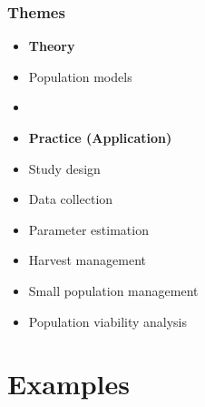 \documentclass[color=usenames,dvipsnames]{beamer}
\begin{document}
\begin{frame}
  \frametitle{Themes}
  \large
  \begin{itemize}
    \item[] {\hspace{-0.9cm} \bf Theory}
    \item Population models
    \item[]
    \item[] {\hspace{-0.9cm} \bf Practice (Application)}
    \item Study design
    \item Data collection
    \item Parameter estimation
    \item Harvest management
    \item Small population management
    \item Population viability analysis
  \end{itemize}
\end{frame}








\section{Examples}
\end{document}
